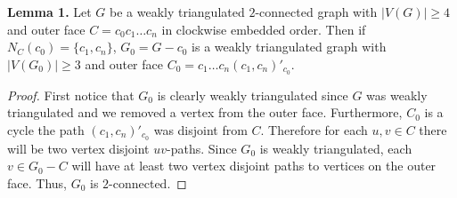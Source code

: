 \documentclass[11pt,letter]{article}
\begin{document}
\begin{adjustwidth}{2em}{2em}
\noindent \textbf{Lemma 1.} Let $G$ be a weakly triangulated $2$-connected graph with $|V(G)|\ge 4$ and
outer face
$C=c_0c_1\ldots c_{n}$ in clockwise embedded order. Then if $N_C(c_0)=\{c_{1},c_{n}\}$,
$G_0=G-c_0$ is a weakly triangulated graph with $|V(G_0)|\ge 3$ and outer face
$C_0=c_1\ldots c_{n}(c_{1},c_{n})'_{c_0}$.\\
\end{adjustwidth}

\begin{proof}
First notice that $G_0$ is clearly weakly triangulated since $G$ was weakly triangulated and we removed a
vertex from the outer face. Furthermore, $C_0$ is a cycle the path $(c_1,c_n)'_{c_0}$ was disjoint from $C$.
Therefore for each $u,v\in C$ there will be two vertex disjoint $uv$-paths. Since $G_0$
is weakly triangulated, each $v\in G_0-C$ will have at least two vertex disjoint
paths to vertices on the outer face. Thus, $G_0$ is $2$-connected.
\begin{comment}A disjoint $uv$-path will be a $uv$-path
that is vertex disjoint except for the vertices $u$ and $v$.
Let $u,v\in G_0$. If $u,v\in C_0$ then there are clearly two disjoint $uv$-paths. If $u\in C_0$ and
$v\not\in C_0$, there are two edge disjoint paths $v$ to $C_0$, and thus two disjoint $uv$-paths. Finally,
if $u,v\not\in C_0$ then we may find two disjoint paths from $u$ to $C_0$ and two disjoint paths $v$ to $C_0$
and join each pair using the outer cycle.
Clearly in each case we have two edge disjoint $uv$-paths and $G_0$ is $2$-connected.\end{comment}
\end{proof}
\hfill\\
\end{document}
